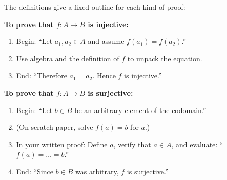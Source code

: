 The definitions give a fixed outline for each kind of proof:

\begin{focusbox}
\textbf{To prove that $f: A \to B$ is injective:}
\begin{enumerate}
\item Begin: ``Let $a_1, a_2 \in A$ and assume $f(a_1) = f(a_2)$.''
\item Use algebra and the definition of $f$ to unpack the equation.
\item End: ``Therefore $a_1 = a_2$. Hence $f$ is injective.''
\end{enumerate}

\textbf{To prove that $f: A \to B$ is surjective:}
\begin{enumerate}
\item Begin: ``Let $b \in B$ be an arbitrary element of the codomain.''
\item (On scratch paper, solve $f(a) = b$ for $a$.)
\item In your written proof: Define $a$, verify that $a \in A$, and evaluate: ``$f(a) = \dots = b$.''
\item End: ``Since $b \in B$ was arbitrary, $f$ is surjective.''
\end{enumerate}
\end{focusbox}

